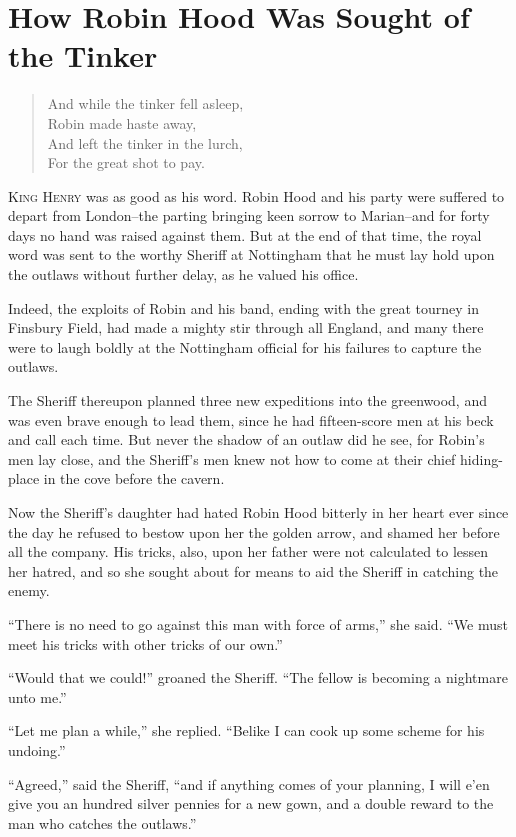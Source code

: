 \chapter{How Robin Hood Was Sought of the Tinker}

\begin{quote}
And while the tinker fell asleep,\\
Robin made haste away,\\
And left the tinker in the lurch,\\
For the great shot to pay.
\end{quote}

\lettrine{K}{ing Henry} was as good as his word. Robin Hood and his party
were suffered to depart from London--the parting bringing keen sorrow to
Marian--and for forty days no hand was raised against them. But at the
end of that time, the royal word was sent to the worthy Sheriff at
Nottingham that he must lay hold upon the outlaws without further delay,
as he valued his office.

Indeed, the exploits of Robin and his band, ending with the great
tourney in Finsbury Field, had made a mighty stir through all England,
and many there were to laugh boldly at the Nottingham official for his
failures to capture the outlaws.

The Sheriff thereupon planned three new expeditions into the greenwood,
and was even brave enough to lead them, since he had fifteen-score men
at his beck and call each time. But never the shadow of an outlaw did he
see, for Robin's men lay close, and the Sheriff's men knew not how to
come at their chief hiding-place in the cove before the cavern.

Now the Sheriff's daughter had hated Robin Hood bitterly in her heart
ever since the day he refused to bestow upon her the golden arrow, and
shamed her before all the company. His tricks, also, upon her father
were not calculated to lessen her hatred, and so she sought about for
means to aid the Sheriff in catching the enemy.

``There is no need to go against this man with force of arms,'' she
said. ``We must meet his tricks with other tricks of our own.''

``Would that we could!'' groaned the Sheriff. ``The fellow is becoming a
nightmare unto me.''

``Let me plan a while,'' she replied. ``Belike I can cook up some scheme
for his undoing.''

``Agreed,'' said the Sheriff, ``and if anything comes of your planning,
I will e'en give you an hundred silver pennies for a new gown, and a
double reward to the man who catches the outlaws.''

